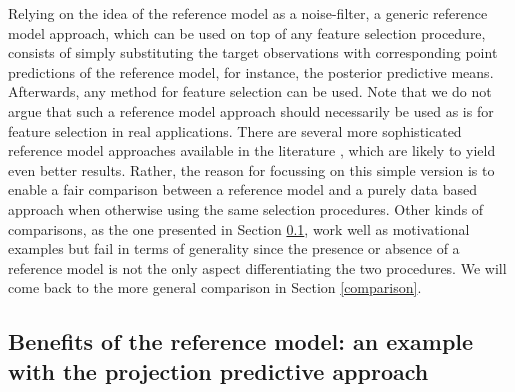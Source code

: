 \documentclass[american,]{article}
\theoremstyle{definition}
\begin{document}

Relying on the idea of the reference model as a noise-filter, a generic reference model approach, which can be used on top of any feature selection procedure, consists of simply substituting the target observations with corresponding point predictions of the reference model, for instance, the posterior predictive means. Afterwards, any method for feature selection can be used. Note that we do not argue that such a reference model approach should necessarily be used as is for feature selection in real applications. There are several more sophisticated reference model approaches available in the literature \cite[see, e.g.][]{paper:projpred,paananen2017variable,paul2008preconditioning}, which are likely to yield even better results. Rather, the reason for focussing on this simple version is to enable a fair comparison between a reference model and a purely data based approach when otherwise using the same selection procedures. Other kinds of comparisons, as the one presented in Section \ref{projection}, work well as motivational examples but fail in terms of generality since the presence or absence of a reference model is not the only aspect differentiating the two procedures. We will come back to the more general comparison in Section \ref{comparison}.


\hypertarget{projection}{%
\subsection{Benefits of the reference model: an example with the projection predictive approach}\label{projection}}
\end{document}

